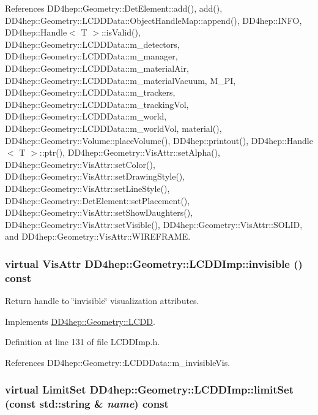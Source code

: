 References DD4hep::Geometry::DetElement::add(), add(), DD4hep::Geometry::LCDDData::ObjectHandleMap::append(), DD4hep::INFO, DD4hep::Handle$<$ T $>$::isValid(), DD4hep::Geometry::LCDDData::m\_\-detectors, DD4hep::Geometry::LCDDData::m\_\-manager, DD4hep::Geometry::LCDDData::m\_\-materialAir, DD4hep::Geometry::LCDDData::m\_\-materialVacuum, M\_\-PI, DD4hep::Geometry::LCDDData::m\_\-trackers, DD4hep::Geometry::LCDDData::m\_\-trackingVol, DD4hep::Geometry::LCDDData::m\_\-world, DD4hep::Geometry::LCDDData::m\_\-worldVol, material(), DD4hep::Geometry::Volume::placeVolume(), DD4hep::printout(), DD4hep::Handle$<$ T $>$::ptr(), DD4hep::Geometry::VisAttr::setAlpha(), DD4hep::Geometry::VisAttr::setColor(), DD4hep::Geometry::VisAttr::setDrawingStyle(), DD4hep::Geometry::VisAttr::setLineStyle(), DD4hep::Geometry::DetElement::setPlacement(), DD4hep::Geometry::VisAttr::setShowDaughters(), DD4hep::Geometry::VisAttr::setVisible(), DD4hep::Geometry::VisAttr::SOLID, and DD4hep::Geometry::VisAttr::WIREFRAME.\hypertarget{class_d_d4hep_1_1_geometry_1_1_l_c_d_d_imp_acd728b63a476d036e305dcd5fc82cd9d}{
\subsubsection[{invisible}]{\setlength{\rightskip}{0pt plus 5cm}virtual {\bf VisAttr} DD4hep::Geometry::LCDDImp::invisible () const}}
\label{class_d_d4hep_1_1_geometry_1_1_l_c_d_d_imp_acd728b63a476d036e305dcd5fc82cd9d}


Return handle to \char`\"{}invisible\char`\"{} visualization attributes. 

Implements \hyperlink{class_d_d4hep_1_1_geometry_1_1_l_c_d_d_acafee280cadae2b44117eb751e0790aa}{DD4hep::Geometry::LCDD}.

Definition at line 131 of file LCDDImp.h.

References DD4hep::Geometry::LCDDData::m\_\-invisibleVis.\hypertarget{class_d_d4hep_1_1_geometry_1_1_l_c_d_d_imp_a1c46d8eb90566d0d9644ff42d2803f00}{
\subsubsection[{limitSet}]{\setlength{\rightskip}{0pt plus 5cm}virtual {\bf LimitSet} DD4hep::Geometry::LCDDImp::limitSet (const std::string \& {\em name}) const}}
\label{class_d_d4hep_1_1_geometry_1_1_l_c_d_d_imp_a1c46d8eb90566d0d9644ff42d2803f00}


